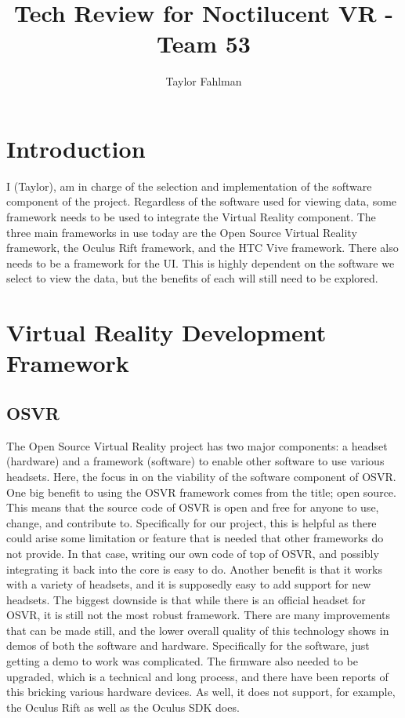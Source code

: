 \documentclass{article}
\begin{document}
\title {Tech Review for Noctilucent VR - Team 53}
\author {Taylor Fahlman}

\maketitle
\newpage
\thispagestyle{empty}
\mbox{}


\section{Introduction}

I (Taylor), am in charge of the selection and implementation of the software component of the project.
Regardless of the software used for viewing data, some framework needs to be used to integrate the Virtual Reality component.
The three main frameworks in use today are the Open Source Virtual Reality framework, the Oculus Rift framework, and the 
HTC Vive framework.
There also needs to be a framework for the UI. This is highly dependent on the software we select to view the data,
but the benefits of each will still need to be explored.

\section{Virtual Reality Development Framework}
\subsection{OSVR}
The Open Source Virtual Reality project has two major components: a headset (hardware) and a framework (software) to enable
other software to use various headsets. Here, the focus in on the viability of the software component of OSVR. 
One big benefit to using the OSVR framework comes from the title; open source. This means that the source code
of OSVR is open and free for anyone to use, change, and contribute to. Specifically for our project, this is helpful
as there could arise some limitation or feature that is needed that other frameworks do not provide. In that case,
writing our own code of top of OSVR, and possibly integrating it back into the core is easy to do. Another benefit
is that it works with a variety of headsets, and it is supposedly easy to add support for new headsets.
The biggest downside is that while there is an official headset for OSVR, it is still not the most robust framework.
There are many improvements that can be made still, and the lower overall quality of this technology shows in demos
of both the software and hardware. Specifically for the software, just getting a demo to work was complicated. The firmware
also needed to be upgraded, which is a technical and long process, and there have been reports of this bricking various
hardware devices. As well, it does not support, for example, the Oculus Rift as well as the Oculus SDK does.
\end{document}
